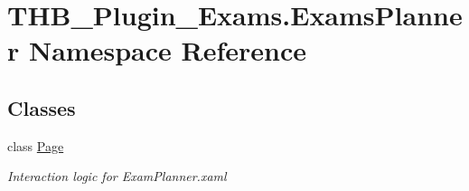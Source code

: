\hypertarget{namespace_t_h_b___plugin___exams_1_1_exams_planner}{}\section{T\+H\+B\+\_\+\+Plugin\+\_\+\+Exams.\+Exams\+Planner Namespace Reference}
\label{namespace_t_h_b___plugin___exams_1_1_exams_planner}
\subsection*{Classes}
\begin{DoxyCompactItemize}
\item 
class \mbox{\hyperlink{class_t_h_b___plugin___exams_1_1_exams_planner_1_1_page}{Page}}
\begin{DoxyCompactList}\small\item\em Interaction logic for Exam\+Planner.\+xaml \end{DoxyCompactList}\end{DoxyCompactItemize}
